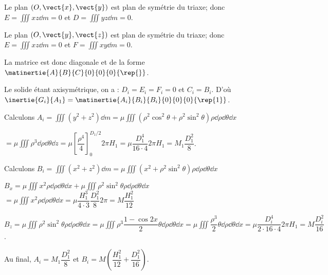 \ifprof
\begin{corrige}

Le plan $\left(O,\vect{x},\vect{y}\right)$ est plan de symétrie du triaxe; donc $E = \iiint xz \dd m = 0 $ et $D = \iiint yz \dd m = 0 $.

Le plan $\left(O,\vect{y},\vect{z}\right)$ est plan de symétrie du triaxe; donc $E = \iiint xz \dd m = 0 $ et $F = \iiint xy \dd m = 0 $.

La matrice est donc diagonale et de la forme $\matinertie{A}{B}{C}{0}{0}{0}{\rep{}}$.

\end{corrige}
\else
\fi

\ifprof
\begin{corrige}
Le solide étant axisymétrique, on a : $D_i=E_i=F_i = 0$ et $C_i=B_i$. D'où  $\inertie{G_i}{A_1}=\matinertie{A_i}{B_i}{B_i}{0}{0}{0}{\rep{1}}$.

Calculons $A_i = \iiint \left(y^2+z^2\right)  \dd m=\mu \iiint \left(\rho^2\cos^2\theta +\rho^2\sin^2\theta\right) \rho \dd \rho \dd \theta \dd x  $

$ = \mu \iiint \rho^3  \dd \rho \dd \theta \dd z  = \mu \left[ \dfrac{\rho^4}{4}\right]_{0}^{D_1/2}2\pi H_1 = \mu \dfrac{D_1^4}{16\cdot 4}2\pi H_1 = M_1 \dfrac{D_1^2}{8}$.


Calculons $B_i = \iiint \left(x^2+z^2\right)  \dd m=\mu \iiint \left(x^2 +\rho^2\sin^2\theta\right) \rho \dd \rho \dd \theta \dd x$ 

$B_x=\mu \iiint x^2  \rho \dd \rho \dd \theta \dd x+\mu \iiint \rho^2\sin^2\theta \rho \dd \rho \dd \theta \dd x  $
$=\mu \iiint x^2  \rho \dd \rho \dd \theta \dd x = \mu \dfrac{H_1^3}{4\cdot 3}\dfrac{D_1^2}{8} 2\pi  = M  \dfrac{H_1^2}{12}   $

$B_z =\mu \iiint \rho^2\sin^2\theta \rho \dd \rho \dd \theta \dd x =\mu \iiint \rho^3\dfrac{1-\cos 2x}{2}\theta  \dd \rho \dd \theta \dd x=\mu \iiint \dfrac{\rho^3}{2}\theta  \dd \rho \dd \theta \dd x =\mu \dfrac{D_i^4}{2\cdot 16\cdot 4}2 \pi H_1 =M  \dfrac{D_i^2}{16}$.

Au final, $A_i =M_1 \dfrac{D_1^2}{8}$ et  $B_i =M\left(\dfrac{H_1^2}{12} + \dfrac{D_1^2}{16} \right)$.





\end{corrige}
